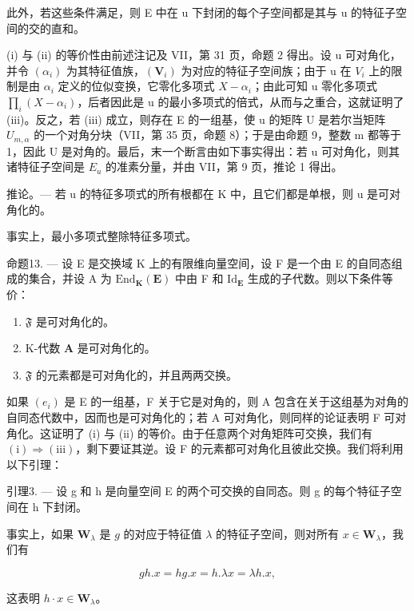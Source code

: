 此外，若这些条件满足，则 E 中在 u 下封闭的每个子空间都是其与 u 的特征子空间的交的直和。

(i) 与 (ii) 的等价性由前述注记及 VII，第 31 页，命题 2 得出。设 u 可对角化，并令 \((\alpha_{i})\) 为其特征值族，\((\mathbf{V}_{i})\) 为对应的特征子空间族；由于 u 在 \(V_{i}\) 上的限制是由 \(\alpha_{i}\) 定义的位似变换，它零化多项式 \(X - \alpha_{i}\)；由此可知 u 零化多项式 \(\prod_{i}(X - \alpha_{i})\)，后者因此是 u 的最小多项式的倍式，从而与之重合，这就证明了 (iii)。反之，若 (iii) 成立，则存在 E 的一组基，使 u 的矩阵 U 是若尔当矩阵 \(U_{m,\alpha}\) 的一个对角分块（VII，第 35 页，命题 8）；于是由命题 9，整数 m 都等于 1，因此 U 是对角的。最后，末一个断言由如下事实得出：若 u 可对角化，则其诸特征子空间是 \(E_{u}\) 的准素分量，并由 VII，第 9 页，推论 1 得出。

推论。--- 若 u 的特征多项式的所有根都在 K 中，且它们都是单根，则 u 是可对角化的。

事实上，最小多项式整除特征多项式。

命题13. --- 设 E 是交换域 K 上的有限维向量空间，设 F 是一个由 E 的自同态组成的集合，并设 A 为 \(\mathrm{End}_{\mathbf{K}}(\mathbf{E})\) 中由 F 和 \(\mathrm{Id}_{\mathbf{E}}\) 生成的子代数。则以下条件等价：

\begin{enumerate}
\def\labelenumi{(\roman{enumi})}
\item
  \(\mathfrak{F}\) 是可对角化的。
\item
  K-代数 \(\mathbf{A}\) 是可对角化的。
\item
  \(\mathfrak{F}\) 的元素都是可对角化的，并且两两交换。
\end{enumerate}

如果 \((e_{i})\) 是 E 的一组基，F 关于它是对角的，则 A 包含在关于这组基为对角的自同态代数中，因而也是可对角化的；若 A 可对角化，则同样的论证表明 F 可对角化。这证明了 (i) 与 (ii) 的等价。由于任意两个对角矩阵可交换，我们有 \((\mathrm{i}) \Rightarrow (\mathrm{iii})\)，剩下要证其逆。设 F 的元素都可对角化且彼此交换。我们将利用以下引理：

引理3. --- 设 g 和 h 是向量空间 E 的两个可交换的自同态。则 g 的每个特征子空间在 h 下封闭。

事实上，如果 \(\mathbf{W}_{\lambda}\) 是 \(g\) 的对应于特征值 \(\lambda\) 的特征子空间，则对所有 \(x \in \mathbf{W}_{\lambda}\)，我们有

\[
g h. x = h g. x = h. \lambda x = \lambda h. x,
\]

这表明 \(h \cdot x \in \mathbf{W}_{\lambda}\)。

